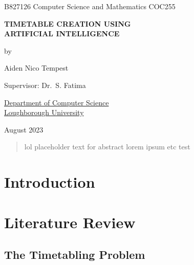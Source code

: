 \documentclass[a4paper, 12pt]{report}
\begin{document}
\graphicspath{{../doc-imgs/}}

\thispagestyle{empty}
\begin{center}
	\Large{
		B827126 \hfill Computer Science and Mathematics \hfill COC255
	}
	\vspace*{\fill}

	\Large{\textbf{TIMETABLE CREATION USING\\ARTIFICIAL INTELLIGENCE}}

	\vspace*{\fill}

	by

	\vspace*{\fill}

	Aiden Nico Tempest

	\vspace*{\fill}

	Supervisor: Dr.\ S. Fatima

	\vspace*{\fill}

	\underline{Department of Computer Science} \\ \underline{Loughborough
	University}

	\vspace*{\fill}
	
	August 2023

\end{center} %

\newpage

\restoregeometry

\begin{abstract} %
	lol placeholder text for abstract lorem ipsum etc test
\end{abstract}


\tableofcontents

\newpage

\chapter{Introduction} %

\chapter{Literature Review}

\section{The Timetabling Problem}
\end{document}
